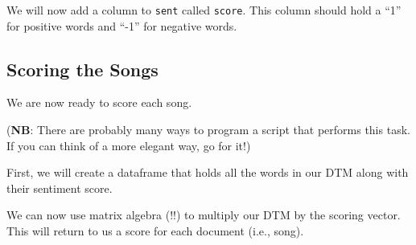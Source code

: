 \documentclass[
]{book}
\newenvironment{Shaded}{\begin{snugshade}}{\end{snugshade}}
\newcommand{\CommentTok}[1]{\textcolor[rgb]{0.56,0.35,0.01}{\textit{#1}}}
\newcommand{\DataTypeTok}[1]{\textcolor[rgb]{0.13,0.29,0.53}{#1}}
\newcommand{\DecValTok}[1]{\textcolor[rgb]{0.00,0.00,0.81}{#1}}
\newcommand{\KeywordTok}[1]{\textcolor[rgb]{0.13,0.29,0.53}{\textbf{#1}}}
\newcommand{\NormalTok}[1]{#1}
\newcommand{\OperatorTok}[1]{\textcolor[rgb]{0.81,0.36,0.00}{\textbf{#1}}}
\newcommand{\StringTok}[1]{\textcolor[rgb]{0.31,0.60,0.02}{#1}}
\begin{document}
We will now add a column to \texttt{sent} called \texttt{score}. This column should hold a ``1'' for positive words and ``-1'' for negative words.

\begin{Shaded}
\end{Shaded}

\hypertarget{scoring-the-songs}{%
\subsection{Scoring the Songs}\label{scoring-the-songs}}

We are now ready to score each song.

(\textbf{NB}: There are probably many ways to program a script that performs this task. If you can think of a more elegant way, go for it!)

First, we will create a dataframe that holds all the words in our DTM along with their sentiment score.

\begin{Shaded}
\end{Shaded}

We can now use matrix algebra (!!) to multiply our DTM by the scoring vector. This will return to us a score for each document (i.e., song).
\end{document}

